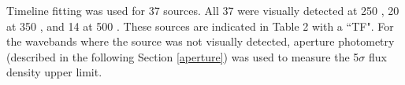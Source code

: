 Timeline fitting was used for 37 sources. All 37 were visually detected at 250 \um{}, 20 at 350 \um{}, and 14 at 500 \um. These sources are indicated in Table 2 with a ``TF". For the wavebands where the source was not visually detected, aperture photometry (described in the following Section \ref{aperture}) was used to measure the 5$\sigma$ flux density upper limit.